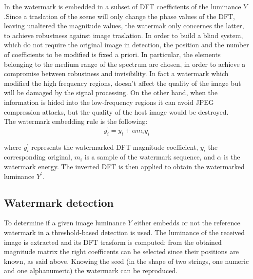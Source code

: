 In \cite{PIVA} the watermark is embedded in a subset of DFT coefficients of the luminance $Y$.\newline Since a traslation of the scene will only change the phase values of the DFT, leaving unaltered the magnitude values, the watermak only concernes the latter, to achieve robustness against image traslation.\newline
In order to build a blind system, which do not require the original image in detection, the position and the number of coefficients to be modified is fixed a priori. In particular, the elements belonging to the medium range of the
spectrum are chosen, in order to achieve a compromise between robustness and invisibility. In fact a watermark which modified the high frequency regions, doesn't affect the quality of the image but will be damaged by the signal processing. On the other hand, when the information is hided into the low-frequency regions it can avoid JPEG compression attacks, but the quality of the host image would be destroyed.\\
The watermark embedding rule is the following:
\begin{equation}\label{eq:wat}
y_{i}^{'} = y_{i}+\alpha m_{i}y_{i} 
\end{equation}

where $y_{i}^{'}$ represents the watermarked DFT magnitude coefficient, $y_{i}$ the corresponding original, $m_{i}$ is a sample of the watermark sequence, and $\alpha$ is the watermark energy.\newline
The inverted DFT is then applied to obtain the watermarked luminance $Y^{'}$.

\subsection{Watermark detection}

To determine if a given image luminance $Y$ either embedds or not the reference watermark in \cite{PIVA} a threshold-based detection is used.\newline
The luminance of the received image is extracted and its DFT trasform is computed; from the obtained magnitude matrix the right coefficents can be selected since their positions are known, as said above.\newline
Knowing the seed (in the shape of two strings, one numeric and one alphanumeric) the watermark can be reproduced.\newline

